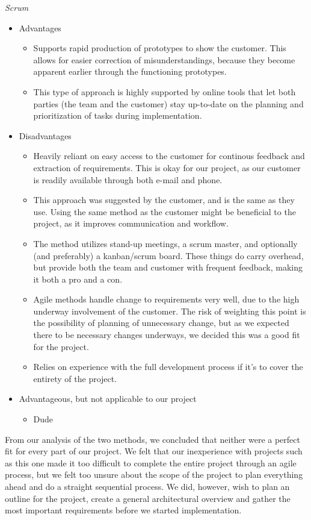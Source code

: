 \emph{Scrum}

\begin{itemize}
	\item Advantages
	\begin{itemize}
		\item Supports rapid production of prototypes to show the customer. This allows for easier correction of misunderstandings, because they become apparent earlier through the functioning prototypes.
		\item This type of approach is highly supported by online tools that let both parties (the team and the customer) stay up-to-date on the planning and prioritization of tasks during implementation.
	\end{itemize}
	\item Disadvantages
	\begin{itemize}
		\item Heavily reliant on easy access to the customer for continous feedback and extraction of requirements. This is okay for our project, as our customer is readily available through both e-mail and phone. %
		\item This approach was suggested by the customer, and is the same as they use. Using the same method as the customer might be beneficial to the project, as it improves communication and workflow.
		\item The method utilizes stand-up meetings, a scrum master, and optionally (and preferably) a kanban/scrum board. These things do carry overhead, but provide both the team and customer with frequent feedback, making it both a pro and a con.
		\item Agile methods handle change to requirements very well, due to the high underway involvement of the customer. The risk of weighting this point is the possibility of planning of unnecessary change, but as we expected there to be necessary changes underways, we decided this was a good fit for the project. %
		\item Relies on experience with the full development process if it’s to cover the entirety of the project.
	\end{itemize}
	\item Advantageous, but not applicable to our project
	\begin{itemize}
		\item Dude
	\end{itemize}
\end{itemize}
From our analysis of the two methods, we concluded that neither were a perfect fit for every part of our project. We felt that our inexperience with projects such as this one made it too difficult to complete the entire project through an agile process, but we felt too unsure about the scope of the project to plan everything ahead and do a straight sequential process. We did, however, wish to plan an outline for the project, create a general architectural overview and gather the most important requirements before we started implementation.

